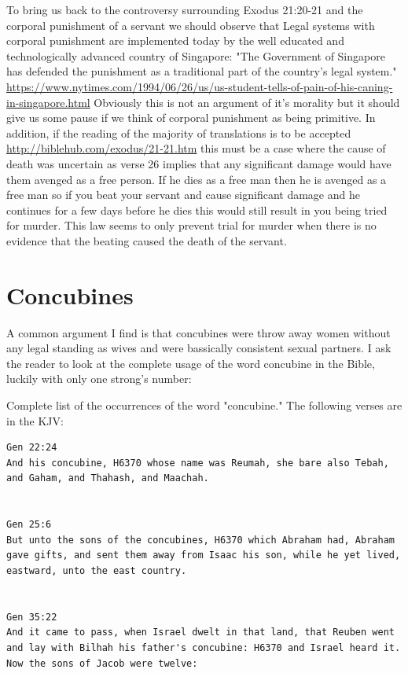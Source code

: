 \documentclass[11pt]{article}
\begin{document}
{To bring us back to the controversy surrounding Exodus 21:20-21 and the corporal punishment of a servant we should observe that Legal systems with corporal punishment are implemented today by the well educated and technologically advanced country of Singapore: "The Government of Singapore has defended the punishment as a traditional part of the country's legal system." \url{https://www.nytimes.com/1994/06/26/us/us-student-tells-of-pain-of-his-caning-in-singapore.html} Obviously this is not an argument of it's morality but it should give us some pause if we think of corporal punishment as being primitive. In addition, if the reading of the majority of translations is to be accepted \url{http://biblehub.com/exodus/21-21.htm} this must be a case where the cause of death was uncertain as verse 26 implies that any significant damage would have them avenged as a free person. If he dies as a free man then he is avenged as a free man so if you beat your servant and cause significant damage and he continues for a few days before he dies this would still result in you being tried for murder. This law seems to only prevent trial for murder when there is no evidence that the beating caused the death of the servant.


\section{Concubines}

A common argument I find is that concubines were throw away women without any legal standing as wives and were bassically consistent sexual partners. I ask the reader to look at the complete usage of the word concubine in the Bible, luckily with only one strong's number:

Complete list of the occurrences of the word "concubine." The following verses are in the KJV:

\begin{lstlisting}
Gen 22:24
And his concubine, H6370 whose name was Reumah, she bare also Tebah, and Gaham, and Thahash, and Maachah.


Gen 25:6
But unto the sons of the concubines, H6370 which Abraham had, Abraham gave gifts, and sent them away from Isaac his son, while he yet lived, eastward, unto the east country.


Gen 35:22
And it came to pass, when Israel dwelt in that land, that Reuben went and lay with Bilhah his father's concubine: H6370 and Israel heard it. Now the sons of Jacob were twelve:



\end{lstlisting}}
\end{document}
